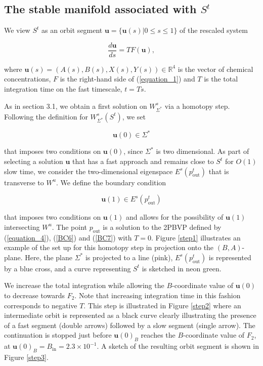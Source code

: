 \documentclass{ws-ijbc}
\begin{document}
\subsection{The stable manifold associated with $S^t$}    

We view $S^t$ as an orbit segment $\mathbf{u} = \{\mathbf{u}(s)| 0 \leq s \leq 1 \}$ of the rescaled system

\begin{equation}
\frac{d\mathbf{u}}{ds} = TF(\mathbf{u}),
\label{equation_4}
\end{equation}
    
\noindent
where $\mathbf{u}(s) = (A(s), B(s), X(s), Y(s)) \in \mathbb{R}^4$ is the vector of chemical concentrations, $F$ is the right-hand side of (\ref{equation_1}) and $T$ is the total integration time on the fast timescale, $t=Ts$.
    
As in section 3.1, we obtain a first solution on $W^s_{\Sigma^*}$ via a homotopy step.  Following the definition for $W^s_{\Sigma^*}(S^t)$, we set
    
\begin{equation}
\mathbf{u}(0) \in \Sigma^*
\label{BC6}
\end{equation}
    
 \noindent
that imposes two conditions on $\mathbf{u}(0)$, since $\Sigma^*$ is two dimensional.  As part of selecting a solution $\mathbf{u}$ that has a fast approach and remains close to $S^t$ for $O(1)$ slow time, we consider the two-dimensional eigenspace $E^s(p^t_{\text{out}})$ that is transverse to $W^u$.  We define the boundary condition
    
\begin{equation}
\mathbf{u}(1) \in E^s(p^t_{\text{out}})
\label{BC7}
\end{equation}
    
\noindent
that imposes two conditions on $\mathbf{u}(1)$ and allows for the possibility of $\mathbf{u}(1)$ intersecting $W^u$.  The point $p_{\text{out}}$ is a solution to the 2PBVP defined by (\ref{equation_4}), (\ref{BC6}) and (\ref{BC7}) with $T=0$.  Figure \ref{step1} illustrates an example of the set up for this homotopy step in projection onto the $(B,A)$-plane.  Here, the plane $\Sigma^*$ is projected to a line (pink), $E^s(p^t_{\mathrm{out}})$ is represented by a blue cross, and a curve representing $S^t$ is sketched in neon green.
    
We increase the total integration while allowing the $B$-coordinate value of $\mathbf{u}(0)$ to decrease towards $F_2$.  Note that increasing integration time in this fashion corresponds to negative $T$.  This step is illustrated in Figure \ref{step2} where an intermediate orbit is represented as a black curve clearly illustrating the presence of a fast segment (double arrows) followed by a slow segment (single arrow).  The continuation is stopped just before $\mathbf{u}(0)_B$ reaches the $B$-coordinate value of $F_2$, at $\mathbf{u}(0)_B = B_{\text{in}}=2.3 \times 10^{-1}$.  A sketch of the resulting orbit segment is shown in Figure \ref{step3}.
    
\end{document}
